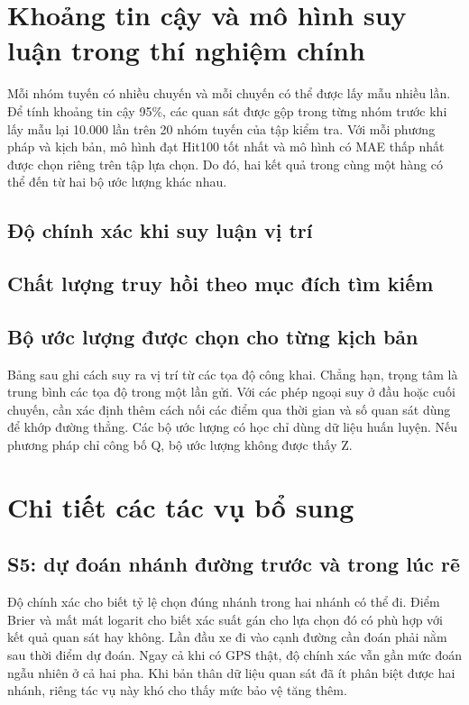 \chapter{Khoảng tin cậy và mô hình suy luận trong thí nghiệm chính}\label{app:main-ci}
Mỗi nhóm tuyến có nhiều chuyến và mỗi chuyến có thể được lấy mẫu nhiều lần. Để tính khoảng tin cậy 95\%, các quan sát được gộp trong từng nhóm trước khi lấy mẫu lại 10.000 lần trên 20 nhóm tuyến của tập kiểm tra. Với mỗi phương pháp và kịch bản, mô hình đạt Hit100 tốt nhất và mô hình có MAE thấp nhất được chọn riêng trên tập lựa chọn. Do đó, hai kết quả trong cùng một hàng có thể đến từ hai bộ ước lượng khác nhau.
\section{Độ chính xác khi suy luận vị trí}

\section{Chất lượng truy hồi theo mục đích tìm kiếm}


\section{Bộ ước lượng được chọn cho từng kịch bản}
Bảng sau ghi cách suy ra vị trí từ các tọa độ công khai. Chẳng hạn, trọng tâm là trung bình các tọa độ trong một lần gửi. Với các phép ngoại suy ở đầu hoặc cuối chuyến, cần xác định thêm cách nối các điểm qua thời gian và số quan sát dùng để khớp đường thẳng. Các bộ ước lượng có học chỉ dùng dữ liệu huấn luyện. Nếu phương pháp chỉ công bố Q, bộ ước lượng không được thấy Z.


\chapter{Chi tiết các tác vụ bổ sung}\label{app:extended}
\section{S5: dự đoán nhánh đường trước và trong lúc rẽ}
Độ chính xác cho biết tỷ lệ chọn đúng nhánh trong hai nhánh có thể đi. Điểm Brier và mất mát logarit cho biết xác suất gán cho lựa chọn đó có phù hợp với kết quả quan sát hay không. Lần đầu xe đi vào cạnh đường cần đoán phải nằm sau thời điểm dự đoán. Ngay cả khi có GPS thật, độ chính xác vẫn gần mức đoán ngẫu nhiên ở cả hai pha. Khi bản thân dữ liệu quan sát đã ít phân biệt được hai nhánh, riêng tác vụ này khó cho thấy mức bảo vệ tăng thêm.

